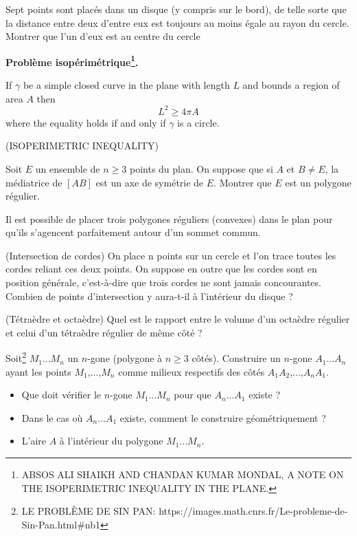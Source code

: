 \begin{example}
Sept points sont placés dans un disque (y compris sur le bord), de telle sorte que la
distance entre deux d’entre eux est toujours au moins égale au rayon du cercle. Montrer que
l’un d’eux est au centre du cercle
\end{example}

\textbf{Problème isopérimétrique\footnote{ABSOS ALI SHAIKH AND CHANDAN KUMAR MONDAL, A NOTE ON THE ISOPERIMETRIC INEQUALITY IN THE PLANE.}.}
\\
\begin{theorem}
If $\gamma$ be a simple closed curve in the plane with length $L$ and bounds a region of area $A$ then
\[
L^{2} \geq 4 \pi A
\]
where the equality holds if and only if $\gamma$ is a circle.
\end{theorem}

\begin{example}{(ISOPERIMETRIC INEQUALITY)}
\end{example}

\begin{exercise}
Soit $E$ un ensemble de $n \geq 3$ points du plan. On suppose que si $A$ et $B \neq E$, la médiatrice
de $\left[AB\right]$ est un axe de symétrie de $E$. Montrer que $E$ est un polygone régulier.
\end{exercise}

\begin{exercise}
Il est possible de placer trois polygones réguliers (convexes) dans le plan pour qu'ils s'agencent parfaitement autour d'un sommet commun.
\end{exercise}

\begin{exercise}{(Intersection de cordes)}
On place n points sur un cercle et l'on trace toutes les cordes reliant ces deux points. On
suppose en outre que les cordes sont en position générale, c'est-à-dire que trois cordes ne
sont jamais concourantes. Combien de points d'intersection y aura-t-il à l'intérieur du disque ?
\end{exercise}

\begin{exercise}{(Tétraèdre et octaèdre)}
Quel est le rapport entre le volume d'un octaèdre régulier et celui d'un tétraèdre régulier de même côté ?
\end{exercise}
\begin{exercise}
Soit\footnote{LE PROBLÈME DE SIN PAN: https://images.math.cnrs.fr/Le-probleme-de-Sin-Pan.html\#nb1} $M_{1}$...$M_{n}$ un $n$-gone (polygone à $n\geq 3$ côtés). Construire un $n$-gone $A_{1}$...$A_{n}$ ayant les points $M_{1}$,...,$M_{n}$ comme milieux respectifs des côtés $A_{1}A_{2}$,...,$A_{n}A_{1}$.
 \begin{itemize}
   \item Que doit vérifier le $n$-gone $M_{1}$...$M_{n}$ pour que $A_{n}$...$A_{1}$ existe ?
   \item Dans le cas où $A_{n}$...$A_{1}$ existe, comment le construire géométriquement ?
   \item L'aire $A$ à l'intérieur du polygone $M_{1}$...$M_{n}$.
 \end{itemize}

\end{exercise}
